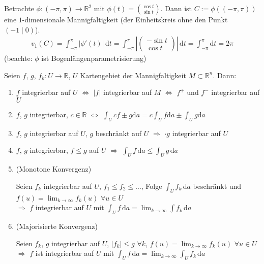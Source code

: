 \begin{example}
	Betrachte $\phi\colon (-\pi,\pi)\to\mathbb{R}^2$ mit $\phi(t) = \binom{\cos t}{\sin t}$. Dann ist $C:= \phi((-\pi,\pi))$ eine $1$-dimensionale Mannigfaltigkeit (der Einheitskreis ohne den Punkt $(-1\mid 0)$).
	\begin{align*}
		v_1(C) = \int_{-\pi}^\pi \vert\phi'(t)\vert\,\mathrm{d}t = \int_{-\pi}^\pi \left\vert\begin{pmatrix}
			-\sin t\\\cos t
		\end{pmatrix}\right\vert\,\mathrm{d}t = \int_{-\pi}^\pi \mathrm{d}t = 2\pi
	\end{align*}
	(beachte: $\phi$ ist Bogenlängenparametrisierung)
\end{example}

\begin{proposition}
	Seien $f$, $g$, $f_k\colon U\to \mathbb{R}$, $U$ Kartengebiet der Mannigfaltigkeit $M\subset\mathbb{R}^n$. Dann: \begin{enumerate}[label={\arabic*)}]
		\item $f$ integrierbar auf $U$ $\Leftrightarrow$ $\vert f \vert$ integrierbar auf $M$ $\Leftrightarrow$ $f^+$ und $f^-$ integrierbar auf $U$
		\item $f$, $g$ integrierbar, $c\in\mathbb{R}$ $\Leftrightarrow$ $\int_U cf \pm g\mathrm{d}a = c\int_Uf\mathrm{d}a \pm\int_U g\mathrm{d}a$
		\item $f$, $g$ integrierbar auf $U$, $g$ beschränkt auf $U$ $\Rightarrow$ $\cdot g$ integrierbar auf $U$
		\item $f$, $g$ integrierbar, $f\le g$ auf $U$ $\Rightarrow$ $\int_Uf\,\mathrm{d}a\le\int_Ug\,\mathrm{d}a$
		\item (Monotone Konvergenz)
		
		Seien $f_k$ integrierbar auf $U$, $f_1\le f_2\le \dotsc$, Folge $\int_U f_k\,\mathrm{d}a$ beschränkt und $f(u) = \lim_{k\to\infty} f_k(u)$ $\forall u\in U$ \\
		\hspace*{0.5em}$\Rightarrow$ $f$ integrierbar auf $U$ mit $\int_U f\,\mathrm{d}a = \lim_{k\to\infty} \int f_k\,\mathrm{d}a$
		\item (Majorisierte Konvergenz)
		
		Seien $f_k$, $g$ integrierbar auf $U$, $\vert f_k\vert\le g$ $\forall k$, $f(u) = \lim_{k\to\infty} f_k(u)$ $\forall u\in U$ \\
		\hspace*{0.5em}$\Rightarrow$ $f$ ist integrierbar auf $U$ mit $\int_U f\,\mathrm{d}a = \lim_{k\to\infty} \int_U f_k\,\mathrm{d}a$
	\end{enumerate}
\end{proposition}

